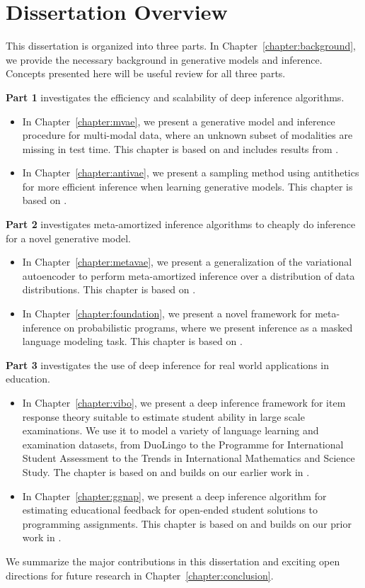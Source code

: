 \section{Dissertation Overview}

This dissertation is organized into three parts. In Chapter~\ref{chapter:background}, we provide the necessary background in generative models and inference. Concepts presented here will be useful review for all three parts.\newline

\noindent\textbf{Part 1} investigates the efficiency and scalability of deep inference algorithms.
\begin{itemize}
    \item In Chapter~\ref{chapter:mvae}, we present a generative model and inference procedure for multi-modal data, where an unknown subset of modalities are missing in test time. This chapter is based on \cite{wu2018multimodal} and includes results from \cite{wu2018multimodal}.
    \item In Chapter~\ref{chapter:antivae}, we present a sampling method using antithetics for more efficient inference when learning generative models. This chapter is based on \cite{wu2019differentiable}.
\end{itemize}

\noindent\textbf{Part 2} investigates meta-amortized inference algorithms to cheaply do inference for a novel generative model. 
\begin{itemize}
    \item In Chapter~\ref{chapter:metavae}, we present a generalization of the variational autoencoder to perform meta-amortized inference over a distribution of data distributions. This chapter is based on \cite{wu2020meta}. 
    \item In Chapter~\ref{chapter:foundation}, we present a novel framework for meta-inference on probabilistic programs, where we present inference as a masked language modeling task. This chapter is based on \cite{wu2022foundation}.
\end{itemize}

\noindent\textbf{Part 3} investigates the use of deep inference for real world applications in education. 
\begin{itemize}
    \item In Chapter~\ref{chapter:vibo}, we present a deep inference framework for item response theory suitable to estimate student ability in large scale examinations. We use it to model a variety of language learning and examination datasets, from DuoLingo to the Programme for International Student Assessment to the Trends in International Mathematics and Science Study. The chapter is based on \cite{wu2021modeling} and builds on our earlier work in \cite{wu2020variational}.
    \item In Chapter~\ref{chapter:ggnap}, we present a deep inference algorithm for estimating educational feedback for open-ended student solutions to programming assignments. This chapter is based on \cite{malik2019generative} and builds on our prior work in \cite{wu2019zero}.
\end{itemize}

\noindent We summarize the major contributions in this dissertation and exciting open directions for future research in Chapter~\ref{chapter:conclusion}.
